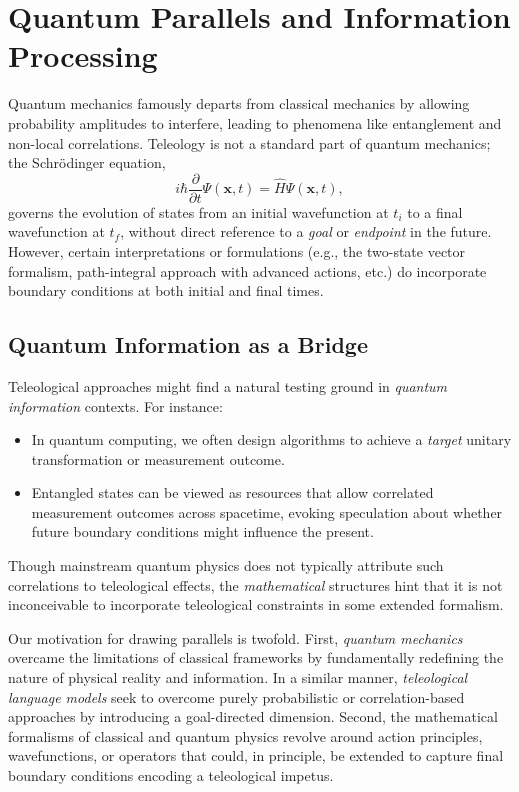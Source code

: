 \documentclass[11pt]{article}
\begin{document}
\section{Quantum Parallels and Information Processing}
\label{sec:quantum-parallels}
Quantum mechanics famously departs from classical mechanics by allowing probability amplitudes to interfere, leading to phenomena like entanglement and non-local correlations. Teleology is not a standard part of quantum mechanics; the Schr\"odinger equation,
\begin{equation}
    i\hbar \frac{\partial}{\partial t} \Psi(\mathbf{x}, t) = \hat{H} \Psi(\mathbf{x}, t),
\end{equation}
governs the evolution of states from an initial wavefunction at $t_i$ to a final wavefunction at $t_f$, without direct reference to a \emph{goal} or \emph{endpoint} in the future. However, certain interpretations or formulations (e.g., the two-state vector formalism, path-integral approach with advanced actions, etc.) do incorporate boundary conditions at both initial and final times.

\subsection{Quantum Information as a Bridge}
Teleological approaches might find a natural testing ground in \emph{quantum information} contexts. For instance:
\begin{itemize}
    \item In quantum computing, we often design algorithms to achieve a \emph{target} unitary transformation or measurement outcome.
    \item Entangled states can be viewed as resources that allow correlated measurement outcomes across spacetime, evoking speculation about whether future boundary conditions might influence the present.
\end{itemize}
Though mainstream quantum physics does not typically attribute such correlations to teleological effects, the \emph{mathematical} structures hint that it is not inconceivable to incorporate teleological constraints in some extended formalism.

Our motivation for drawing parallels is twofold. First, \emph{quantum mechanics} overcame the limitations of classical frameworks by fundamentally redefining the nature of physical reality and information. In a similar manner, \emph{teleological language models} seek to overcome purely probabilistic or correlation-based approaches by introducing a goal-directed dimension. Second, the mathematical formalisms of classical and quantum physics revolve around action principles, wavefunctions, or operators that could, in principle, be extended to capture final boundary conditions encoding a teleological impetus.
\end{document}
